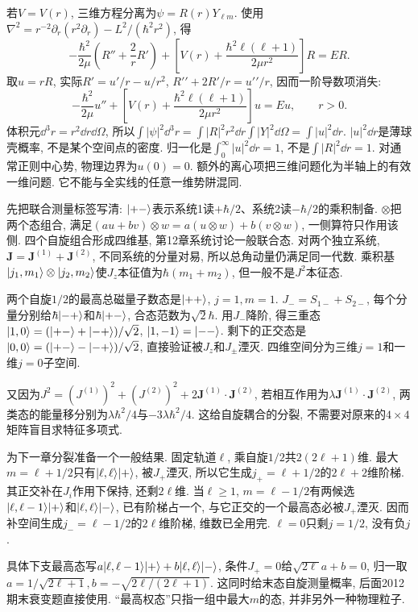 若$V=V(r)$, 三维方程分离为$\psi=R(r)Y_{\ell m}$. 使用
$\nabla^2=r^{-2}\partial_r(r^2\partial_r)-L^2/(\hbar^2r^2)$, 得
\[
-\frac{\hbar^2}{2\mu}\left(R''+\frac2rR'\right)
+\left[V(r)+\frac{\hbar^2\ell(\ell+1)}{2\mu r^2}\right]R=ER.
\]
取$u=rR$, 实际$R\prime=u\prime/r-u/r^2$, $R\prime\prime+2R\prime/r=u\prime\prime/r$, 因而一阶导数项消失:
\begin{equation}\label{eq:radial}
-\frac{\hbar^2}{2\mu}u''+
\left[V(r)+\frac{\hbar^2\ell(\ell+1)}{2\mu r^2}\right]u=Eu,
\qquad r>0.
\end{equation}
体积元$\dd^3r=r^2\dd r\dd\Omega$, 所以$\int|\psi|^2\dd^3r=\int|R|^2r^2\dd r\int|Y|^2\dd\Omega=\int|u|^2\dd r$. $|u|^2\dd r$是薄球壳概率, 不是某个空间点的密度. 归一化是$\int_0^\infty|u|^2\dd r=1$, 不是$\int|R|^2\dd r=1$. 对通常正则中心势, 物理边界为$u(0)=0$. 额外的离心项把三维问题化为半轴上的有效一维问题. 它不能与全实线的任意一维势阱混同.

先把联合测量标签写清: $\lvert +-\rangle$表示系统1读$+\hbar/2$、系统2读$-\hbar/2$的乘积制备. $\otimes$把两个态组合, 满足$(a u+bv)\otimes w=a(u\otimes w)+b(v\otimes w)$, 一侧算符只作用该侧. 四个自旋组合形成四维基, 第12章系统讨论一般联合态. 对两个独立系统, $\boldsymbol J=\boldsymbol J^{(1)}+\boldsymbol J^{(2)}$, 不同系统的分量对易, 所以总角动量仍满足同一代数. 乘积基$\lvert j_1,m_1\rangle\otimes\lvert j_2,m_2\rangle$使$J_z$本征值为$\hbar(m_1+m_2)$, 但一般不是$J^2$本征态.

两个自旋$1/2$的最高总磁量子数态是$\lvert ++\rangle$, $j=1,m=1$. $J_-=S_{1-}+S_{2-}$, 每个分量分别给$\hbar\lvert -+\rangle$和$\hbar\lvert +-\rangle$, 合态范数为$\sqrt2\hbar$. 用$J_-$降阶, 得三重态$\lvert 1,0\rangle=(\lvert +-\rangle+\lvert -+\rangle)/\sqrt2$, $\lvert 1,-1\rangle=\lvert --\rangle$. 剩下的正交态是$\lvert 0,0\rangle=(\lvert +-\rangle-\lvert -+\rangle)/\sqrt2$, 直接验证被$J_z$和$J_\pm$湮灭. 四维空间分为三维$j=1$和一维$j=0$子空间.

又因为$J^2=(J^{(1)})^2+(J^{(2)})^2+2\boldsymbol J^{(1)}\cdot\boldsymbol J^{(2)}$, 若相互作用为$\lambda\boldsymbol J^{(1)}\cdot\boldsymbol J^{(2)}$, 两类态的能量移分别为$\lambda\hbar^2/4$与$-3\lambda\hbar^2/4$. 这给自旋耦合的分裂, 不需要对原来的$4\times4$矩阵盲目求特征多项式.

为下一章分裂准备一个一般结果. 固定轨道$\ell$, 乘自旋$1/2$共$2(2\ell+1)$维. 最大$m=\ell+1/2$只有$\lvert \ell,\ell\rangle\lvert +\rangle$, 被$J_+$湮灭, 所以它生成$j_+=\ell+1/2$的$2\ell+2$维阶梯. 其正交补在$J_i$作用下保持, 还剩$2\ell$维. 当$\ell\geq1$, $m=\ell-1/2$有两候选$\lvert \ell,\ell-1\rangle\lvert +\rangle$和$\lvert \ell,\ell\rangle\lvert -\rangle$, 已有阶梯占一个, 与它正交的一个最高态必被$J_+$湮灭. 因而补空间生成$j_-=\ell-1/2$的$2\ell$维阶梯, 维数已全用完. $\ell=0$只剩$j=1/2$, 没有负$j$.

具体下支最高态写$a\lvert \ell,\ell-1\rangle\lvert +\rangle+b\lvert \ell,\ell\rangle\lvert -\rangle$, 条件$J_+=0$给$\sqrt{2\ell}a+b=0$, 归一取$a=1/\sqrt{2\ell+1},b=-\sqrt{2\ell/(2\ell+1)}$. 这同时给末态自旋测量概率, 后面2012期末衰变题直接使用. “最高权态”只指一组中最大$m$的态, 并非另外一种物理粒子.
